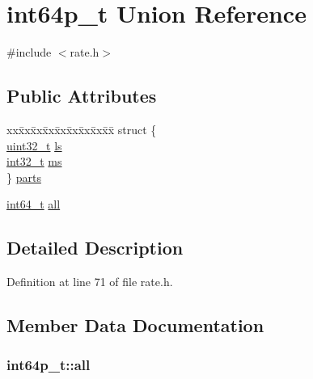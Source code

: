 \hypertarget{unionint64p__t}{}\section{int64p\+\_\+t Union Reference}
\label{unionint64p__t}


{\ttfamily \#include $<$rate.\+h$>$}

\subsection*{Public Attributes}
\begin{DoxyCompactItemize}
\item 
\begin{tabbing}
xx\=xx\=xx\=xx\=xx\=xx\=xx\=xx\=xx\=\kill
struct \{\\
\>\hyperlink{lib-src_2ffmpeg_2win32_2stdint_8h_a6eb1e68cc391dd753bc8ce896dbb8315}{uint32\_t} \hyperlink{unionint64p__t_ab20d63e2a65e64bc0beaf2f592e29def}{ls}\\
\>\hyperlink{lib-src_2ffmpeg_2win32_2stdint_8h_a37994e3b11c72957c6f454c6ec96d43d}{int32\_t} \hyperlink{unionint64p__t_af620bcbcdc8227cf614d9c87c9152c78}{ms}\\
\} \hyperlink{unionint64p__t_a4b913516f1e51f6bcc2875fab015346c}{parts}\\

\end{tabbing}\item 
\hyperlink{lib-src_2ffmpeg_2win32_2stdint_8h_a67a9885ef4908cb72ce26d75b694386c}{int64\+\_\+t} \hyperlink{unionint64p__t_ade4ccdfd254886682b29e035b73ad657}{all}
\end{DoxyCompactItemize}


\subsection{Detailed Description}


Definition at line 71 of file rate.\+h.



\subsection{Member Data Documentation}
\subsubsection[{\texorpdfstring{all}{all}}]{ int64p\+\_\+t\+::all}\hypertarget{unionint64p__t_ade4ccdfd254886682b29e035b73ad657}{}\label{unionint64p__t_ade4ccdfd254886682b29e035b73ad657}


